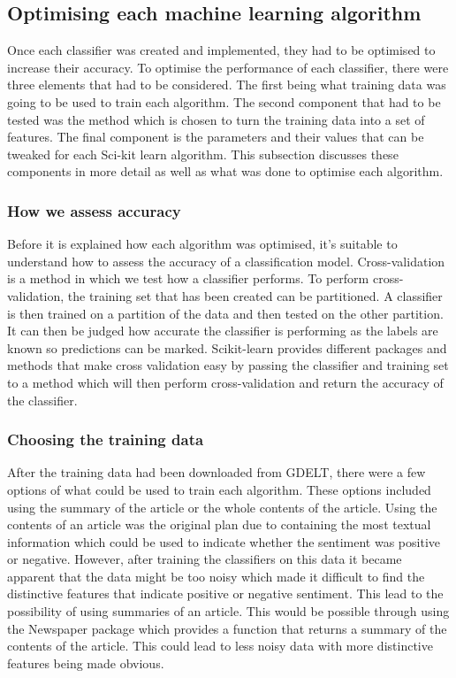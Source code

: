 \documentclass[a4paper,11pt]{report}
\begin{document}
\subsection {Optimising each machine learning algorithm}
Once each classifier was created and implemented, they had to be optimised to increase their accuracy. To optimise the performance of each classifier, there were three elements that had to be considered. The first being what training data was going to be used to train each algorithm. The second component that had to be tested was the method which is chosen to turn the training data into a set of features. The final component is the parameters and their values that can be tweaked for each Sci-kit learn algorithm. This subsection discusses these components in more detail as well as what was done to optimise each algorithm.

\subsubsection{How we assess accuracy}
Before it is explained how each algorithm was optimised, it's suitable to understand how to assess the accuracy of a classification model. Cross-validation is a method in which we test how a classifier performs. To perform cross-validation, the training set that has been created can be partitioned. A classifier is then trained on a partition of the data and then tested on the other partition. It can then be judged how accurate the classifier is performing as the labels are known so predictions can be marked. Scikit-learn provides different packages and methods that make cross validation easy by passing the classifier and training set to a method which will then perform cross-validation and return the accuracy of the classifier.

\subsubsection{Choosing the training data}
After the training data had been downloaded from GDELT, there were a few options of what could be used to train each algorithm. These options included using the summary of the article or the whole contents of the article. Using the contents of an article was the original plan due to containing the most textual information which could be used to indicate whether the sentiment was positive or negative. However, after training the classifiers on this data it became apparent that the data might be too noisy which made it difficult to find the distinctive features that indicate positive or negative sentiment. This lead to the possibility of using summaries of an article. This would be possible through using the Newspaper package which provides a  function that returns a summary of the contents of the article. This could lead to less noisy data with more distinctive features being made obvious.
\end{document}
